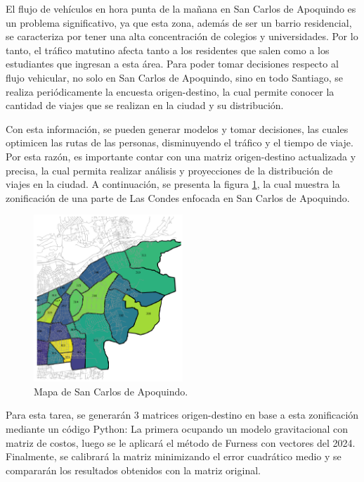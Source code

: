 \documentclass[letterpaper,12pt]{article}
\begin{document}
El flujo de vehículos en hora punta de la mañana en San Carlos de Apoquindo es un problema significativo, ya que esta zona, además de ser un barrio residencial, se caracteriza por tener una alta concentración de colegios y universidades. Por lo tanto, el tráfico matutino afecta tanto a los residentes que salen como a los estudiantes que ingresan a esta área. Para poder tomar decisiones respecto al flujo vehicular, no solo en San Carlos de Apoquindo, sino en todo Santiago, se realiza periódicamente la encuesta origen-destino, la cual permite conocer la cantidad de viajes que se realizan en la ciudad y su distribución.

Con esta información, se pueden generar modelos y tomar decisiones, las cuales optimicen las rutas de las personas, disminuyendo el tráfico y el tiempo de viaje. Por esta razón, es importante contar con una matriz origen-destino actualizada y precisa, la cual permita realizar análisis y proyecciones de la distribución de viajes en la ciudad. A continuación, se presenta la figura \ref{fig:mapa}, la cual muestra la zonificación de una parte de Las Condes enfocada en San Carlos de Apoquindo. 

\begin{figure}[h!]
    \centering
    \includegraphics[width=0.5\textwidth]{fotos/mapa.png}
    \caption{Mapa de San Carlos de Apoquindo.}
    \label{fig:mapa}
\end{figure}

Para esta tarea, se generarán 3 matrices origen-destino en base a esta zonificación mediante un código Python: La primera ocupando un modelo gravitacional con matriz de costos, luego se le aplicará el método de Furness con vectores del 2024. Finalmente, se calibrará la matriz minimizando el error cuadrático medio y se compararán los resultados obtenidos con la matriz original.
\end{document}
